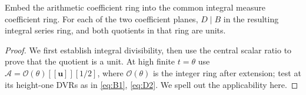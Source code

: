 \begin{proposition}\label{alternation-imaginary:unit}
Embed the arithmetic coefficient ring into the common integral measure coefficient ring. For each of the two coefficient planes, \(D\mid B\) in the resulting integral series ring, and both quotients in that ring are units.
\end{proposition}
\begin{proof}
We first establish integral divisibility, then use the central scalar
ratio to prove that the quotient is a unit. At high finite \(t=\theta\)
use \(\mathscr A=\mathcal O(\theta)[[\mathbf u]][1/2]\), where
\(\mathcal O(\theta)\) is the integer ring after extension; test at its
height-one DVRs as in \eqref{eq:B1}, \eqref{eq:D2}. We spell out the
applicability here.


\end{proof}
